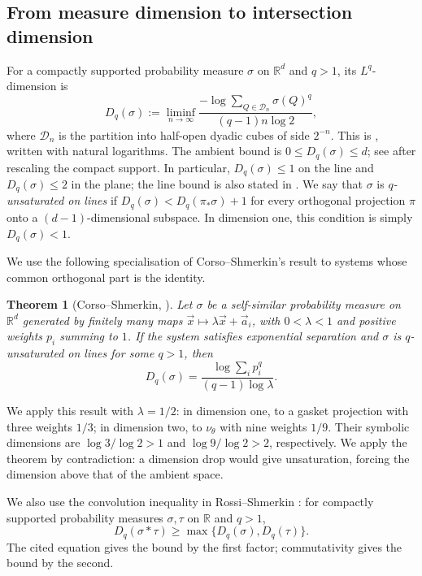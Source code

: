 \documentclass[scheme=plain]{ctexart}
\newtheorem{theorem}{Theorem}[section]
\begin{document}
\subsection{From measure dimension to intersection dimension}

For a compactly supported probability measure $\sigma$ on $\mathbb R^d$ and $q>1$, its $L^q$-dimension is
\[
D_q(\sigma):=\liminf_{n\to\infty}
\frac{-\log\sum_{Q\in\mathcal D_n}\sigma(Q)^q}{(q-1)n\log2},
\]
where $\mathcal D_n$ is the partition into half-open dyadic cubes of side $2^{-n}$.
This is \cite[Definition~1.3]{corso2024dynamical}, written with natural logarithms.
The ambient bound is $0\le D_q(\sigma)\le d$; see \cite[Section~1.2, inequality~(1.2)]{corso2024dynamical} after rescaling the compact support.
In particular, $D_q(\sigma)\le1$ on the line and $D_q(\sigma)\le2$ in the plane; the line bound is also stated in \cite[Section~1, p.~2, before~(1.1)]{rossi2018measures}.
We say that $\sigma$ is \emph{$q$-unsaturated on lines} if $D_q(\sigma)<D_q(\pi_*\sigma)+1$ for every orthogonal projection $\pi$ onto a $(d-1)$-dimensional subspace.
In dimension one, this condition is simply $D_q(\sigma)<1$.

We use the following specialisation of Corso--Shmerkin's result to systems whose common orthogonal part is the identity.

\begin{theorem}[Corso--Shmerkin, {\cite[Corollary~4.2]{corso2024dynamical}}]
\label{thm:corso-shmerkin}
Let $\sigma$ be a self-similar probability measure on $\mathbb R^d$ generated by finitely many maps $\vec x\mapsto\lambda\vec x+\vec a_i$, with $0<\lambda<1$ and positive weights $p_i$ summing to $1$.
If the system satisfies exponential separation and $\sigma$ is $q$-unsaturated on lines for some $q>1$, then
\[
D_q(\sigma)=\frac{\log\sum_i p_i^q}{(q-1)\log\lambda}.
\]
\end{theorem}

We apply this result with $\lambda=1/2$: in dimension one, to a gasket projection with three weights $1/3$; in dimension two, to $\nu_\theta$ with nine weights $1/9$.
Their symbolic dimensions are $\log3/\log2>1$ and $\log9/\log2>2$, respectively.
We apply the theorem by contradiction: a dimension drop would give unsaturation, forcing the dimension above that of the ambient space.

We also use the convolution inequality in Rossi--Shmerkin \cite[Section~1, equation~(1.2)]{rossi2018measures}: for compactly supported probability measures $\sigma,\tau$ on $\mathbb R$ and $q>1$,
\[
D_q(\sigma*\tau)\ge\max\{D_q(\sigma),D_q(\tau)\}.
\]
The cited equation gives the bound by the first factor; commutativity gives the bound by the second.
\end{document}
